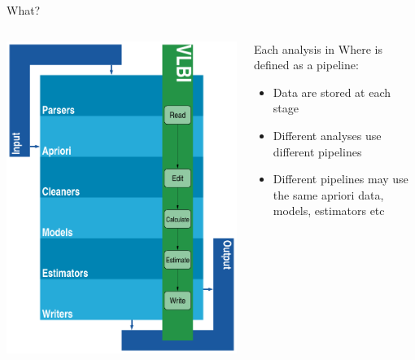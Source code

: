 \documentclass[ignorenonframetext,12pt,t]{beamer}
\begin{document}
\begin{frame}{What?}
  \begin{columns}
    \begin{column}[T]{0.49\textwidth}
      \includegraphics[width=\textwidth]{figure/code_structure_vlbi}
    \end{column}

    \begin{column}[T]{0.49\textwidth}
      Each analysis in Where is defined as a pipeline:
      \pause
    
      \begin{itemize}
      \item Data are stored at each stage
      \item Different analyses use different pipelines
      \item Different pipelines may use the same apriori data, models, estimators etc
      \end{itemize}
    \end{column}
  \end{columns}
\end{frame}
\end{document}
